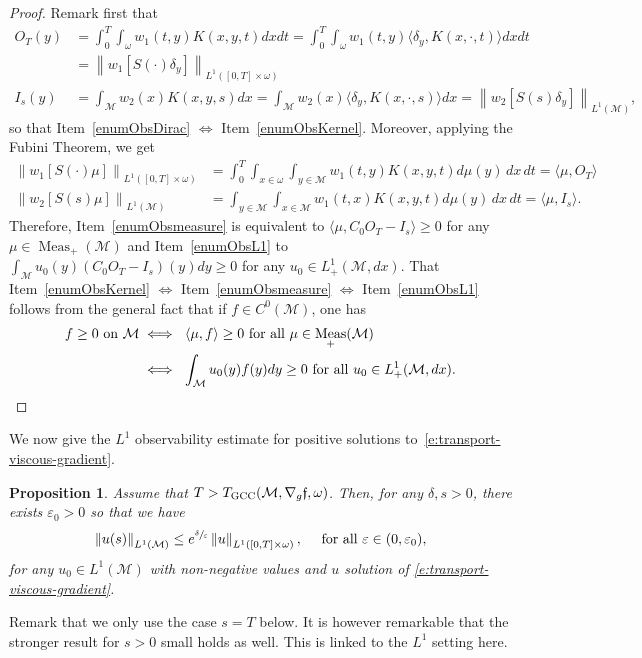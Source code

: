 \documentclass[JEP,XML,SOM,Unicode]{cedram}
\newcommand{\GCC}{\textup{GCC}}
\newtheorem{proposition}[lemma]{Proposition}
\theoremstyle{definition}
\newcommand{\M}{\ensuremath{\mathcal M}}
\newcommand{\f}{\ensuremath{\mathfrak{f}}}
\DeclareMathOperator{\Meas}{Meas}
\newcommand\bnp{\begin{proof}}
\newcommand\enp{\end{proof}}
\newcommand\nor[2]{\left\|#1\right\|_{#2}}
\let\e\varepsilon
\let\eps\varepsilon
\begin{document}
\bnp
Remark first that
\begin{align*}
O_T(y)& =\int_0^T \int_{\omega} w_1(t,y)K(x,y,t)dx dt = \int_0^T \int_{\omega} w_1(t,y)\langle \delta_y, K(x,\cdot,t ) \rangle dx dt \\
& = \nor{w_1 \left[S(\cdot) \delta_y \right]}{L^1([0,T]\times \omega)}\\
I_s (y)& =\int_{\M} w_2(x)K(x,y, s)dx = \int_{\M}w_2(x)\langle \delta_y, K(x,\cdot,s)\rangle dx = \nor{w_2 \left[S(s) \delta_y \right]}{L^1(\M)},
\end{align*}
so that Item~\eqref{enumObsDirac} $\Leftrightarrow$ Item~\eqref{enumObsKernel}. Moreover, applying the Fubini Theorem, we get
\begin{align*}
\nor{w_1 [S(\cdot)\mu]}{L^1([0,T]\times \omega)} &=\int_0^T \int_{x\in \omega}\int_{y\in \M} w_1(t,y)K(x,y,t)d\mu(y)\,dx\,dt=\langle \mu, O_T \rangle\\
\nor{w_2 \left[S(s)\mu\right]}{L^1(\M)}&=\int_{y\in \M}\int_{x\in \M} w_1(t,x)K(x,y,t)d\mu(y)\,dx\,dt=\langle \mu, I_s \rangle.
\end{align*}
Therefore, Item~\eqref{enumObsmeasure} is equivalent to $\langle \mu, C_0O_T-I_s \rangle \geq 0$ for any $\mu \in \Meas_+(\M)$ and Item~\eqref{enumObsL1} to $\int_\M u_0(y) (C_0O_T-I_s )(y) dy \geq 0$ for any $u_0 \in L^1_+(\M,dx)$. That Item~\eqref{enumObsKernel} $\Leftrightarrow$ Item~\eqref{enumObsmeasure} $\Leftrightarrow$ Item~\eqref{enumObsL1} follows from the general fact that if $f \in C^0(\M)$, one has
\begin{align*}
f \geq 0 \text{ on }\M & \iff \ \langle \mu, f \rangle \geq 0 \text{ for all }\mu \in \Meas_+(\M) \\
& \iff \ \int_\M u_0(y) f(y) dy \geq 0\text{ for all }u_0 \in L^1_+(\M,dx).\qedhere
\end{align*}
\enp
We now give the $L^1$ observability estimate for positive solutions to~\eqref{e:transport-viscous-gradient}.
\begin{proposition}
\label{propobsL1}
Assume that $T>T_{\GCC}(\M, \nabla_g\f,\omega)$. Then, for any $\delta, s >0$, there exists $\e_0>0$ so that we have
\begin{equation}
\label{estimL1+}
\nor{u(s)}{L^1(\M)}\leq e^{\sfrac{\delta}{\e}}\nor{u}{L^1([0,T]\times \omega)}, \quad \text{ for all } \eps \in (0,\eps_0),
\end{equation}
for any $u_0\in L^1(\M)$ with non-negative values and $u$ solution of \eqref{e:transport-viscous-gradient}.
\end{proposition}
Remark that we only use the case $s=T$ below. It is however remarkable that the stronger result for $s >0$ small holds as well. This is linked to the $L^1$ setting here.
\end{document}
